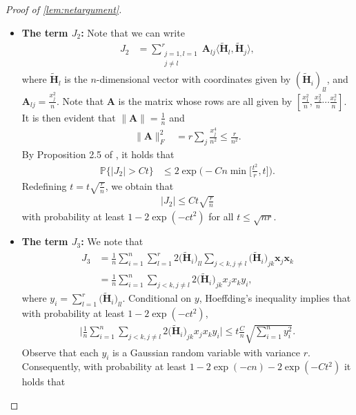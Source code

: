 \documentclass[10pt]{article}
\newcommand{\p}{\mathbb{P}}
\renewcommand{\tilde}{\widetilde}
\theoremstyle{definition}
\begin{document}
\begin{proof}[Proof of \cref{lem:netargument}]
\begin{itemize}
\begin{itemize}
\begin{align}
    \end{align}
    with probability at least $1 - \exp(- t^2)$. 
    \item \textbf{The term $J_2$:} Note that we can write
    \begin{align*}
        J_2 &= \sum_{\substack{j=1,l=1\\j\neq l}}^r \bm{A}_{lj} \langle \bm{\tilde H}_l, \bm{\tilde H}_j \rangle,
    \end{align*}
    where $\bm{\tilde H}_l$ is the $n$-dimensional vector with coordinates given by $(\bm{\tilde H}_i)_{ll}$, and $\bm{A}_{lj} = \frac{x_j^2}{n}$.
Note that $\bm{A}$ is the matrix whose rows are all given by $[\frac{x_1^2}{n}, \frac{x_2^2}{n} \cdots \frac{x_r^2}{n} ]$.  It is then evident that $\|\bm{A}\| = \frac{1}{n}$ and 
 \begin{align*}
     \| \bm{A} \|_F^2 &= r \sum_j \frac{x_j^4}{n^2} \leq \frac{r}{n^2}.
 \end{align*}
        By Proposition 2.5 of \citet{chen_hansonwright_2021}, it holds that
    \begin{align*}
        \p\big\{ | J_2 | > C t \big\} &\leq 2\exp\bigg( - C n\min\bigg[ \frac{ t^2}{r}, t \bigg] \bigg).
    \end{align*}
Redefining $t =  t \sqrt{\frac{r}{n}}$, we obtain that
    \begin{align}
        |J_2| \leq C t \sqrt{\frac{r}{n}}
    \end{align}
    with probability at least  $1 - 2 \exp( - c t^2)$ for all $t \leq \sqrt{nr}$.  
    \item \textbf{The term $J_3$:} We note that
\begin{align}
J_3 &= \frac{1}{n} \sum_{i=1}^n \sum_{l=1}^{r} 2 \big( \bm{\tilde H}_i \big)_{ll} \sum_{j < k,j\neq l} \big( \bm{\tilde H}_i \big)_{jk} \bm{x}_j \bm{x}_k \\
&= \frac{1}{n} \sum_{i=1}^{n} \sum_{j < k, j \neq l} 2 \big( \bm{\tilde H}_i \big)_{jk} x_j x_k y_i,
\end{align}
where $y_i =  \sum_{l=1}^{r} \big( \bm{\tilde H}_i \big)_{ll}.$  Conditional on $y$, Hoeffding's inequality implies that with probability at least $1 - 2 \exp( - c t^2)$, 
\begin{align*}
\bigg| \frac{1}{n} \sum_{i=1}^{n} \sum_{j < k, j \neq l} 2 \big( \bm{\tilde H}_i \big)_{jk} x_j x_k y_i \bigg| \leq t \frac{C}{n} \sqrt{\sum_{i=1}^{n} y_i^2}.
\end{align*}
Observe that each $y_i$ is a Gaussian random variable with variance $r$.  Consequently, with probability at least $1 - 2\exp( - c n) - 2 \exp( - C  t^2) $ it holds that 

\end{itemize}
\end{itemize}
\end{proof}
\end{document}
